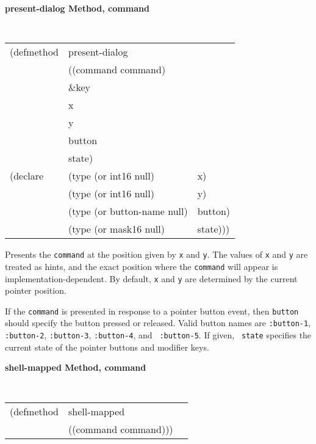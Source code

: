 {\samepage
{\large {\bf present-dialog \hfill Method, command}}
\begin{flushright} \parbox[t]{6.125in}{
\tt
\begin{tabular}{lll}
\raggedright
(defmethod & present-dialog & \\
           & ((command  command)\\
        & \&key \\
        & x \\
        & y\\
        & button\\
        & state)\\
(declare & (type (or int16 null)  & x)\\
         & (type (or int16 null)  & y)\\
        & (type (or button-name null) & button)\\ 
        & (type (or mask16 null)  & state)))\\ 
\end{tabular}
\rm

}\end{flushright}}



\begin{flushright} \parbox[t]{6.125in}{ Presents the {\tt command} at the
position given by {\tt x} and {\tt y}.  The values of {\tt x} and {\tt y} are
treated as hints, and the exact position where the {\tt command} will appear is
implementation-dependent.  By default, {\tt x} and {\tt y} are determined by the
current pointer position.
 
If the {\tt command} is presented in response to a pointer button event, then
{\tt button} should specify the button pressed or released. Valid button names
are {\tt :button-1}, {\tt :button-2}, {\tt :button-3}, {\tt :button-4}, and {\tt
:button-5}. If given, {\tt
state} specifies the current state of the pointer buttons and modifier keys.

}\end{flushright}


{\samepage
{\large {\bf shell-mapped \hfill Method, command}}
\begin{flushright} \parbox[t]{6.125in}{
\tt
\begin{tabular}{lll}
\raggedright
(defmethod & shell-mapped & \\
& ((command  command)))
\end{tabular}
\rm

}\end{flushright}}


